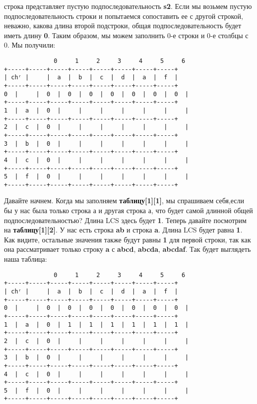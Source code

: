 строка представляет пустую подпоследовательность \textbf{s2}. Если мы возьмем
пустую подпоследовательность строки и попытаемся сопоставить ее с другой
строкой, неважно, какова длина второй подстроки, общая
подпоследовательность будет иметь длину \textbf{0}. Таким образом, мы можем
заполнить 0-е строки и 0-е столбцы с 0. Мы получили:
\vspace{\baselineskip}
\begin{tcolorbox}
\begin{verbatim}
              0     1     2     3     4     5     6
+-----+-----+-----+-----+-----+-----+-----+-----+
| chʳ |     |  a  |  b  |  c  |  d  |  a  |  f  |
+-----+-----+-----+-----+-----+-----+-----+-----+
0  |     |  0  |  0  |  0  |  0  |  0  |  0  |  0  |
+-----+-----+-----+-----+-----+-----+-----+-----+
1  |  a  |  0  |     |     |     |     |     |     |
+-----+-----+-----+-----+-----+-----+-----+-----+
2  |  c  |  0  |     |     |     |     |     |     |
+-----+-----+-----+-----+-----+-----+-----+-----+
3  |  b  |  0  |     |     |     |     |     |     |
+-----+-----+-----+-----+-----+-----+-----+-----+
4  |  c  |  0  |     |     |     |     |     |     |
+-----+-----+-----+-----+-----+-----+-----+-----+
5  |  f  |  0  |     |     |     |     |     |     |
+-----+-----+-----+-----+-----+-----+-----+-----+
\end{verbatim}
\end{tcolorbox}
\vspace{\baselineskip}
Давайте начнем. Когда мы заполняем \textbf{таблицу[1][1]}, мы спрашиваем
себя,если бы у нас была только строка а и другая строка а, что будет самой
длинной общей подпоследовательностью? Длина LCS здесь будет \textbf{1}. Теперь
давайте посмотрим на \textbf{таблицу[1][2]}. У нас есть строка \textbf{ab} и строка \textbf{a}. Длина
LCS будет равна \textbf{1}. Как видите, остальные значения также будут равны \textbf{1} для
первой строки, так как она рассматривает только строку \textbf{a} с \textbf{abcd}, \textbf{abcda},
\textbf{abcdaf}. Так будет выглядеть наша таблица:
\vspace{\baselineskip}
\begin{tcolorbox}
\begin{verbatim}
              0     1     2     3     4     5     6
+-----+-----+-----+-----+-----+-----+-----+-----+
| chʳ |     |  a  |  b  |  c  |  d  |  a  |  f  |
+-----+-----+-----+-----+-----+-----+-----+-----+
0  |     |  0  |  0  |  0  |  0  |  0  |  0  |  0  |
+-----+-----+-----+-----+-----+-----+-----+-----+
1  |  a  |  0  |  1  |  1  |  1  |  1  |  1  |  1  |
+-----+-----+-----+-----+-----+-----+-----+-----+
2  |  c  |  0  |     |     |     |     |     |     |
+-----+-----+-----+-----+-----+-----+-----+-----+
3  |  b  |  0  |     |     |     |     |     |     |
+-----+-----+-----+-----+-----+-----+-----+-----+
4  |  c  |  0  |     |     |     |     |     |     |
+-----+-----+-----+-----+-----+-----+-----+-----+
5  |  f  |  0  |     |     |     |     |     |     |
+-----+-----+-----+-----+-----+-----+-----+-----+
\end{verbatim}
\end{tcolorbox}
